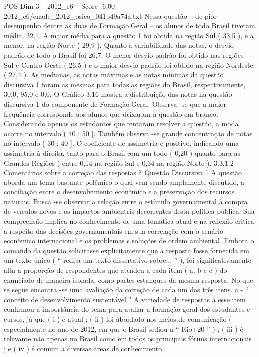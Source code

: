 \begin{textsample}{POS Dim 3 – 2012\_c6 – Score -6.00 – 2012\_c6/enade\_2012\_psico\_041b49a74d.txt}
Nessa questão – de pior desempenho dentre as duas de Formação Geral – os alunos de todo Brasil tiveram média, 32,1.
A maior média para a questão 1 foi obtida na região Sul ( 33,5 ), e a menor, na região Norte ( 29,9 ).
Quanto à variabilidade das notas, o desvio padrão de todo o Brasil foi 26,7.
O menor desvio padrão foi obtido nas regiões Sul e Centro-Oeste ( 26,5 ) e o maior desvio padrão foi obtido na região Nordeste ( 27,4 ).
As medianas, as notas máximas e as notas mínimas da questão discursiva 1 foram as mesmas para todas as regiões do Brasil, respectivamente, 30,0, 95,0 e 0,0.
O Gráfico 3.16 mostra a distribuição das notas na questão discursiva 1 do componente de Formação Geral.
Observa -se que a maior frequência corresponde aos alunos que deixaram a questão em branco.
Considerando apenas os estudantes que tentaram resolver a questão, a moda ocorre no intervalo ( 40 ; 50 ].
Também observa -se grande concentração de notas no intervalo ( 30 ; 40 ].
O coeficiente de assimetria é positivo, indicando uma assimetria à direita, tanto para o Brasil com um todo ( 0,20 ) quanto para as Grandes Regiões ( entre 0,14 na região Sul e 0,34 na região Norte ). 3.3.1.2 Comentários sobre a correção das respostas à Questão Discursiva 1 A questão aborda um tema bastante polêmico o qual vem sendo amplamente discutido, a conciliação entre o desenvolvimento econômico e a preservação dos recursos naturais.
Busca -se observar a relação entre o estímulo governamental à compra de veículos novos e os impactos ambientais decorrentes desta política pública.
Sua compreensão implica no conhecimento de uma temática atual e na reflexão critica a respeito das decisões governamentais em sua correlação com o cenário econômico internacional e os problemas e soluções de ordem ambiental.
Embora o comando da questão solicitasse explicitamente que a resposta fosse fornecida em um texto único ( “ redija um texto dissertativo sobre... ” ), foi significativamente alta a proporção de respondentes que atendeu a cada item ( a, b e c ) do enunciado de maneira isolada, como partes estanques da mesma resposta.
No que se segue encontra -se uma avaliação da correção de cada um dos três itens. a - “ conceito de desenvolvimento sustentável ” A variedade de respostas a esse item confirmou a importância do tema para avaliar a formação geral dos estudantes e cursos, já que ( i ) é atual ; ( ii ) foi abordado nos meios de comunicação ( especialmente no ano de 2012, em que o Brasil sediou a “ Rio+20 ” ) ; ( iii ) é relevante não apenas no Brasil como em todos os principais fóruns internacionais ; e ( iv ) é comum a diversas áreas de conhecimento.

\end{textsample}
